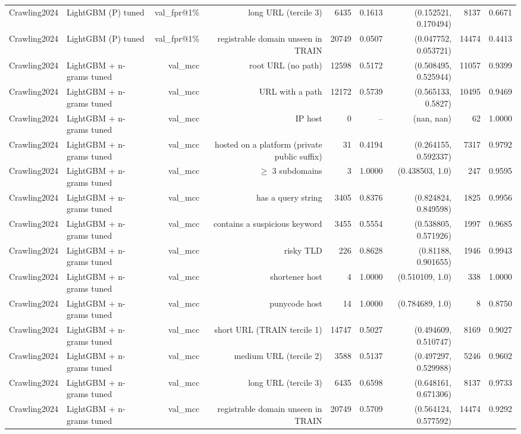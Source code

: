 \begin{table}[t]
\begin{tabular}{llrrrrrrr}
Crawling2024 & LightGBM (P) tuned & val\_fpr@1\% & long URL (tercile 3) & 6435 & 0.1613 & (0.152521, 0.170494) & 8137 & 0.6671 \\
Crawling2024 & LightGBM (P) tuned & val\_fpr@1\% & registrable domain unseen in TRAIN & 20749 & 0.0507 & (0.047752, 0.053721) & 14474 & 0.4413 \\
Crawling2024 & LightGBM + n-grams tuned & val\_mcc & root URL (no path) & 12598 & 0.5172 & (0.508495, 0.525944) & 11057 & 0.9399 \\
Crawling2024 & LightGBM + n-grams tuned & val\_mcc & URL with a path & 12172 & 0.5739 & (0.565133, 0.5827) & 10495 & 0.9469 \\
Crawling2024 & LightGBM + n-grams tuned & val\_mcc & IP host & 0 & -- & (nan, nan) & 62 & 1.0000 \\
Crawling2024 & LightGBM + n-grams tuned & val\_mcc & hosted on a platform (private public suffix) & 31 & 0.4194 & (0.264155, 0.592337) & 7317 & 0.9792 \\
Crawling2024 & LightGBM + n-grams tuned & val\_mcc & $\geq$ 3 subdomains & 3 & 1.0000 & (0.438503, 1.0) & 247 & 0.9595 \\
Crawling2024 & LightGBM + n-grams tuned & val\_mcc & has a query string & 3405 & 0.8376 & (0.824824, 0.849598) & 1825 & 0.9956 \\
Crawling2024 & LightGBM + n-grams tuned & val\_mcc & contains a suspicious keyword & 3455 & 0.5554 & (0.538805, 0.571926) & 1997 & 0.9685 \\
Crawling2024 & LightGBM + n-grams tuned & val\_mcc & risky TLD & 226 & 0.8628 & (0.81188, 0.901655) & 1946 & 0.9943 \\
Crawling2024 & LightGBM + n-grams tuned & val\_mcc & shortener host & 4 & 1.0000 & (0.510109, 1.0) & 338 & 1.0000 \\
Crawling2024 & LightGBM + n-grams tuned & val\_mcc & punycode host & 14 & 1.0000 & (0.784689, 1.0) & 8 & 0.8750 \\
Crawling2024 & LightGBM + n-grams tuned & val\_mcc & short URL (TRAIN tercile 1) & 14747 & 0.5027 & (0.494609, 0.510747) & 8169 & 0.9027 \\
Crawling2024 & LightGBM + n-grams tuned & val\_mcc & medium URL (tercile 2) & 3588 & 0.5137 & (0.497297, 0.529988) & 5246 & 0.9602 \\
Crawling2024 & LightGBM + n-grams tuned & val\_mcc & long URL (tercile 3) & 6435 & 0.6598 & (0.648161, 0.671306) & 8137 & 0.9733 \\
Crawling2024 & LightGBM + n-grams tuned & val\_mcc & registrable domain unseen in TRAIN & 20749 & 0.5709 & (0.564124, 0.577592) & 14474 & 0.9292 \\

\end{tabular}
\end{table}
